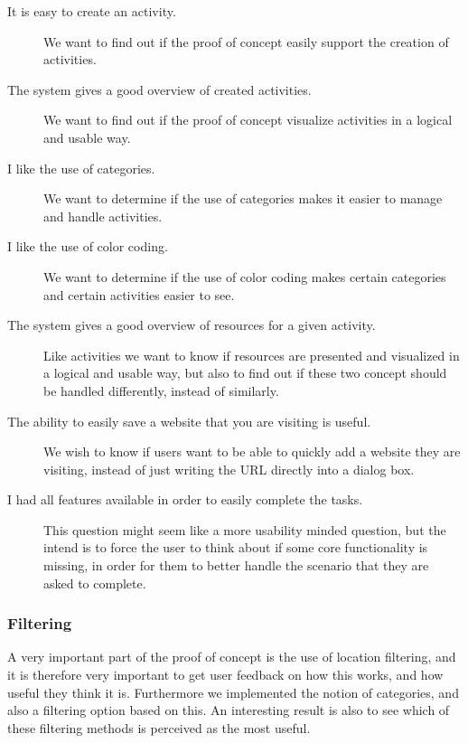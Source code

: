 \begin{description}

  \item[It is easy to create an activity.] We want to find out if the proof of concept easily support the creation of activities. 
  
  \item[The system gives a good overview of created activities.] We want to find out if the proof of concept visualize activities in a logical and usable way. 
  
  \item[I like the use of categories.] We want to determine if the use of categories makes it easier to manage and handle activities.
  
  \item[I like the use of color coding.] We want to determine if the use of color coding makes certain categories and certain activities easier to see.
  
  \item[The system gives a good overview of resources for a given activity.] Like activities we want to know if resources are presented and visualized in a logical and usable way, but also to find out if these two concept should be handled differently, instead of similarly.
  
  \item[The ability to easily save a website that you are visiting is useful.] We wish to know if users want to be able to quickly add a website they are visiting, instead of just writing the URL directly into a dialog box.
  
  \item[I had all features available in order to easily complete the tasks.] This question might seem like a more usability minded question, but the intend is to force the user to think about if some core functionality is missing, in order for them to better handle the scenario that they are asked to complete.
  
\end{description}

\subsubsection{Filtering}
A very important part of the proof of concept is the use of location filtering, and it is therefore very important to get user feedback on how this works, and how useful they think it is. Furthermore we implemented the notion of categories, and also a filtering option based on this. An interesting result is also to see which of these filtering methods is perceived as the most useful.

